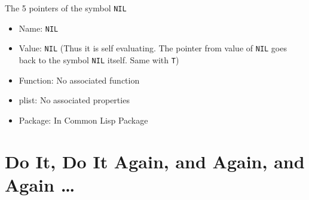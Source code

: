 \documentclass[11pt]{article}
\begin{document}
The 5 pointers of the symbol \texttt{NIL}
\begin{itemize}
\item Name: \texttt{NIL}
\item Value: \texttt{NIL} (Thus it is self evaluating. The pointer from value of \texttt{NIL} goes back to the symbol \texttt{NIL} itself.
Same with \texttt{T})
\item Function: No associated function
\item plist: No associated properties
\item Package: In Common Lisp Package
\end{itemize}


\newpage
\section{Do It, Do It Again, and Again, and Again \ldots{}}
\label{sec:org28246c2}
\end{document}
